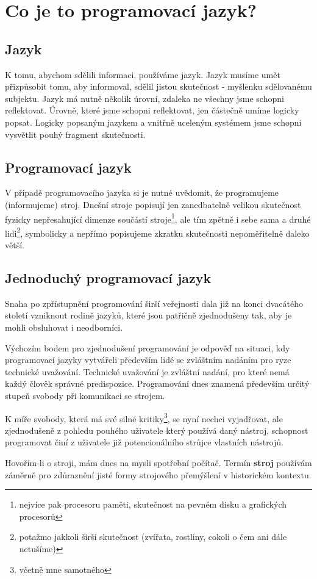 \documentclass[12pt,twopage]{book}
\newcommand{\oddil}[1]{\section{#1}\label{sec:#1}}
\newcommand{\slovnik}[1]{\textbf{\gls{#1}}\index{#1}}
\begin{document}
\chapter{Co je to programovací jazyk?}

\oddil{Jazyk}

K tomu, abychom sdělili informaci, používáme jazyk. Jazyk musíme umět přizpůsobit tomu, aby informoval, sdělil jistou skutečnost - myšlenku sdělovanému subjektu. Jazyk má nutně několik úrovní, zdaleka ne všechny jsme schopni reflektovat. Úrovně, které jsme schopni reflektovat, jen částečně umíme logicky popsat. Logicky popsaným jazykem a vnitřně uceleným systémem jsme schopni vysvětlit pouhý fragment skutečnosti.


\oddil{Programovací jazyk}

V případě programovacího jazyka si je nutné uvědomit, že programujeme (informujeme) stroj. Dnešní stroje popisují jen zanedbatelně velikou skutečnost fyzicky nepřesahující dimenze součástí stroje\footnote{nejvíce pak procesoru paměti, skutečnost na pevném disku a grafických procesorů}, ale tím zpětně i sebe sama a druhé lidi\footnote{potažmo jakkoli širší skutečnost (zvířata, rostliny, cokoli o čem ani dále netušíme)}, symbolicky a nepřímo popisujeme zkratku skutečnosti nepoměřitelně daleko větší.



\oddil{Jednoduchý programovací jazyk}

Snaha po  zpřístupnění programování širší veřejnosti dala již na konci dvacátého století vzniknout rodině jazyků, které jsou patřičně zjednodušeny tak, aby je mohli obsluhovat i neodborníci.

Výchozím bodem pro zjednodušení programování je odpověď na situaci, kdy programovací jazyky vytvářeli především lidé se zvláštním nadáním pro ryze technické uvažování. Technické uvažování je zvláštní nadání, pro které nemá každý člověk správné predispozice. Programování dnes znamená především určitý stupeň svobody při komunikaci se strojem.

K míře svobody, která má své silné kritiky\footnote{včetně mne samotného}, se nyní nechci vyjadřovat, ale zjednodušeně z pohledu pouhého uživatele který používá daný nástroj, schopnost programovat činí z uživatele již potencionálního strůjce vlastních nástrojů.

Hovořím-li o stroji, mám dnes na mysli spotřební počítač. Termín \slovnik{stroj} používám záměrně pro zdůraznění jisté formy strojového přemýšlení v historickém kontextu.
\end{document}
